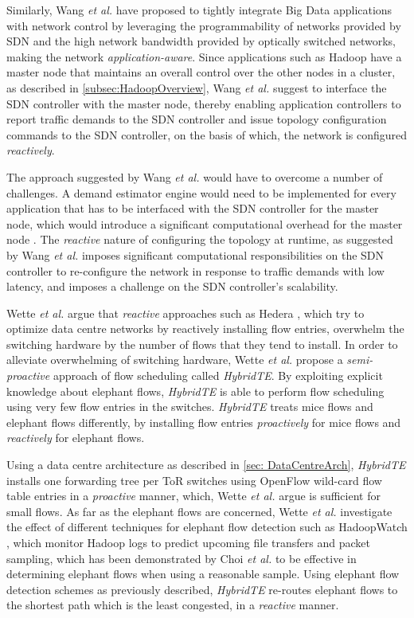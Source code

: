 Similarly, Wang \textit{et al.} \cite{wang2012programming} have proposed to tightly integrate Big Data applications with network control by leveraging the programmability of networks provided by SDN and the high network bandwidth provided by optically switched networks, making the network \textit{application-aware}. Since applications such as Hadoop \cite{HadoopWeb} have a master node that maintains an overall control over the other nodes in a cluster, as described in \ref{subsec:HadoopOverview}, Wang \textit{et al.} suggest to interface the SDN controller with the master node, thereby enabling application controllers to report traffic demands to the SDN controller and issue topology configuration commands to the SDN controller, on the basis of which, the network is configured \textit{reactively}.

The approach suggested by Wang \textit{et al.} \cite{wang2012programming} would have to overcome a number of challenges. A demand estimator engine would need to be implemented for every application that has to be interfaced with the SDN controller for the master node, which would introduce a significant computational overhead for the master node \cite{wang2012programming}. The \textit{reactive} nature of configuring the topology at runtime, as suggested by Wang \textit{et al.} imposes significant computational responsibilities on the SDN controller to re-configure the network in response to traffic demands with low latency, and imposes a challenge on the SDN controller's scalability.

Wette \textit{et al.} \cite{wette2015hybridte} argue that \textit{reactive} approaches such as Hedera \cite{al2010hedera}, which try to optimize data centre networks by reactively installing flow entries, overwhelm the switching hardware by the number of flows that they tend to install. In order to alleviate overwhelming of switching hardware, Wette \textit{et al.} propose a \textit{semi-proactive} approach of flow scheduling called \textit{HybridTE}. By exploiting explicit knowledge about elephant flows, \textit{HybridTE} is able to perform flow scheduling using very few flow entries in the switches. \textit{HybridTE} treats mice flows and elephant flows differently, by installing flow entries \textit{proactively} for mice flows  and \textit{reactively} for elephant flows. 

Using a data centre architecture as described in \ref{sec: DataCentreArch}, \textit{HybridTE} installs one forwarding tree per ToR switches using OpenFlow wild-card flow table entries in a \textit{proactive} manner, which, Wette \textit{et al.} argue is sufficient for small flows. As far as the elephant flows are concerned, Wette \textit{et al.} investigate the effect of different techniques for elephant flow detection such as HadoopWatch \cite{peng2014hadoopwatch}, which monitor Hadoop logs to predict upcoming file transfers and packet sampling, which has been demonstrated by Choi \textit{et al.} \cite{choi2004adaptive} to be effective in determining elephant flows when using a reasonable sample. Using elephant flow detection schemes as previously described, \textit{HybridTE} re-routes elephant flows to the shortest path which is the least congested, in a \textit{reactive} manner. 

